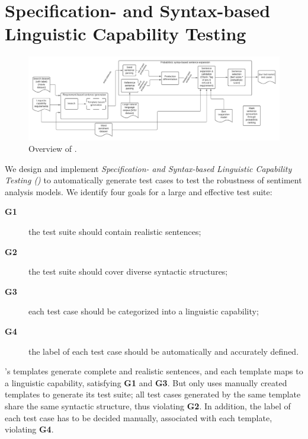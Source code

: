 \section{Specification- and Syntax-based Linguistic Capability Testing}

\begin{figure}
  \centering
  \includegraphics[width=\linewidth]{figs/overview.pdf}
  \caption{Overview of \tool{}.}
  \label{fig:overview}
\end{figure}

  We design and implement
\emph{Specification- and Syntax-based Linguistic Capability Testing
  (\tool{})} to automatically generate test cases to test the
robustness of sentiment analysis models. We identify four goals for a
large and effective test suite:

\begin{description}
\item[{\bf G1}] the test suite should contain realistic sentences;
\item[{\bf G2}] the test suite should cover diverse syntactic
  structures;
  \item[{\bf G3}] each test case should be categorized into a
    linguistic capability;
\item[{\bf G4}] the label of each test case should be
automatically and accurately defined.
\end{description}

\Chlst's templates generate complete and realistic sentences, and each
template maps to a linguistic capability, satisfying {\bf G1} and {\bf
  G3}. But \Chlst only uses  manually created templates to
generate its test suite; all test cases generated by the same template
share the same syntactic structure, thus violating {\bf G2}. In
addition, the label of each \Chlst test case has to be decided
manually, associated with each template, violating {\bf G4}.

